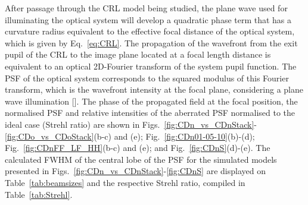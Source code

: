 \begin{refsection}
After passage through the CRL model being studied, the plane wave used for illuminating the optical system will develop a quadratic phase term that has a curvature radius equivalent to the effective focal distance of the optical system, which is given by Eq.~\ref{eq:CRL}. The propagation of the wavefront from the exit pupil of the CRL to the image plane located at a focal length distance is equivalent to an optical 2D-Fourier transform of the system pupil function. The PSF of the optical system corresponds to the squared modulus of this Fourier transform, which is the wavefront intensity at the focal plane, considering a plane wave illumination [\cite[\textit{\S2.3.1} \& \textit{\S6.2}]{Goodman2017}]. The phase of the propagated field at the focal position, the normalised PSF and relative intensities of the aberrated PSF normalised to the ideal case (Strehl ratio) are shown in Figs.~\ref{fig:CDn_vs_CDnStack}-\ref{fig:CDo_vs_CDoStack}(b-c) and (e);  Fig.~\ref{fig:CDn01-05-10}(b)-(d); Fig.~\ref{fig:CDnFF_LF_HH}(b-c) and (e); and Fig.~\ref{fig:CDnS}(d)-(e). The calculated FWHM of the central lobe of the PSF for the simulated models presented in Figs.~\ref{fig:CDn_vs_CDnStack}-\ref{fig:CDnS} are displayed on Table~\ref{tab:beamsizes} and the respective Strehl ratio, compiled in Table~\ref{tab:Strehl}.

\begin{table}[t]
\caption[Strehl ratio for the simulated models in Figs.~\ref{fig:CDn_vs_CDnStack}-\ref{fig:CDnS}]{Comparison of the Strehl ratio for the simulated models in Figs.~\ref{fig:CDn_vs_CDnStack}-\ref{fig:CDnS}}\label{tab:Strehl}%
{}
\end{table}{}


\end{refsection}
